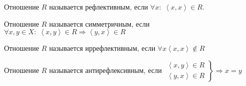\begin{definition}
Отношение $R$ называется рефлективным, если $\forall x: \; \left<x, x\right> \in R$.
\end{definition}
\begin{definition}
    Отношение $R$ называется симметричным, если  $\forall x, y \in X: \; \left<x, y\right> \in R \Rightarrow \left<y, x\right> \in R$
\end{definition}
\begin{definition}
    Отношение $R$ называется иррефлективным, если  $\forall x \left<x,x\right> \notin R$
\end{definition}
\begin{definition}
    Отношение $R$ называется антирефлексивным, если  $\left. \begin{array}{r} \left<x, y\right> \in R \\ \left<y, x\right> \in R\end{array} \right\} \Rightarrow x = y$
\end{definition}

